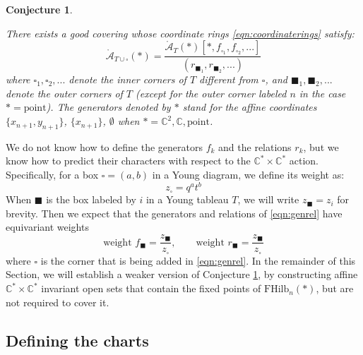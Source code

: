 \documentclass[12pt]{amsart}
\numberwithin{equation}{section}
\newtheorem{conjecture}[theorem]{Conjecture}
\theoremstyle{definition}
\theoremstyle{remark}
\newcommand{\CC}{\mathbb{C}}
\newcommand{\CA}{\mathcal{A}}
\renewcommand{\1}{\mathbf{1}}
\newcommand{\FH}{\mathrm{FHilb}}
\newcommand{\point}{\mathrm{point}}
\newcommand{\torus}{\CC^{*} \times \CC^*}
\newcommand{\sq}{\square}
\newcommand{\bsq}{\blacksquare}
\newcommand{\oCA}{\mathring{\CA}}
\begin{document}
\begin{conjecture}
\label{conj:charts}

There exists a good covering whose coordinate rings \eqref{eqn:coordinaterings} satisfy:
\begin{equation}
\label{eqn:genrel}
\oCA_{T \cup \sq}(*) = \frac {\oCA_{T}(*)[*, f_{\sq_1},f_{\sq_2},...]}{(r_{\bsq_1},r_{\bsq_2},...)}
\end{equation}
where $\square_1,\square_2,...$ denote the inner corners of $T$ different from $\square$, and $\blacksquare_1,\blacksquare_2,...$ denote the outer corners of $T$ (except for the outer corner labeled $n$ in the case $* = \point$). The generators denoted by $*$ stand for the affine coordinates $\{x_{n+1},y_{n+1}\}$, $\{x_{n+1}\}$, $\emptyset$ when $* = \CC^2, \CC, \point$.

\end{conjecture}

We do not know how to define the generators $f_k$ and the relations $r_k$, but we know how to predict their characters with respect to the $\torus$ action. Specifically, for a box $\square = (a,b)$ in a Young diagram, we define its weight as:
\begin{equation}
\label{eqn:weight}
z_\square = q^a t^b
\end{equation}
When $\bsq$ is the box labeled by $i$ in a Young tableau $T$, we will write $z_\bsq = z_i$ for brevity. Then we expect that the generators and relations of \eqref{eqn:genrel} have equivariant weights 
\begin{equation}
\label{eqn:expectation}
\text{weight }f_{\bsq} = \frac {z_{\bsq}}{z_{\square}}, \qquad \text{weight }r_{\bsq} = \frac {z_{\bsq}}{z_{\square}}
\end{equation}
where $\sq$ is the corner that is being added in \eqref{eqn:genrel}. In the remainder of this Section, we will establish a weaker version of Conjecture \ref{conj:charts}, by constructing affine $\torus$ invariant open sets that contain the fixed points of $\FH_n(*)$, but are not required to cover it.




\subsection{Defining the charts}
\label{sub:defcharts}
\end{document}
